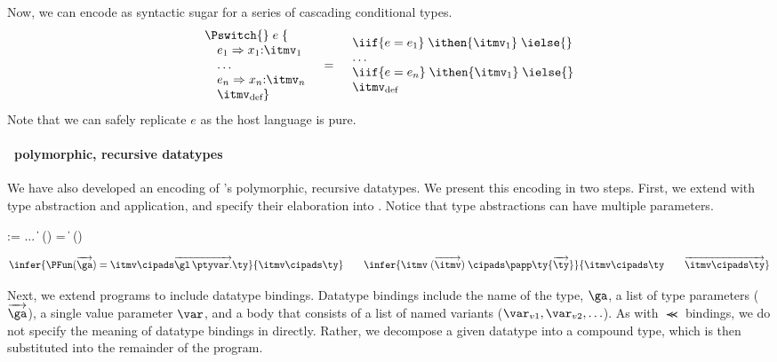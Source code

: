 Now, we can encode \Pswitch{} as syntactic sugar for a series of cascading
conditional types.
{\small
\[
\begin{array}{l}
\Pswitch{}\;e\;\{\\
\quad e_1 \Rightarrow x_1{:}\itmv_1\\ 
\quad \dots \\
\quad e_n \Rightarrow x_n{:}\itmv_n\\
\quad \itmv_{\text{def}} \}
\end{array}
\quad
 \mathbf{=}
\quad
\begin{array}{l} 
    \iif {e = e_1}\; \ithen {\itmv_1}\; \ielse{}\\
    \dots\\
    \iif {e = e_n}\; \ithen {\itmv_1}\; \ielse{}\\
    \itmv_{\text{def}}
\end{array}
\]}%
\noindent
Note that we can safely replicate $e$ as the
host language is pure.

\paragraph*{\padsml\ polymorphic, recursive datatypes}
We have also developed an encoding of \padsml{}'s polymorphic,
recursive datatypes. We present this encoding in two steps. First, we
extend \ipads{} with type abstraction and application, and specify
their elaboration into \ddc{}. Notice that \ipads{} type abstractions
can have multiple parameters.
\begin{bnf}
   \meta{\itmv} \::= ... \| 
\PFun{}\; (\overrightarrow \alpha) = \itmv
  \|   \itmv \; (\overrightarrow \itmv)

\end{bnf}
\[
  \infer{ 
     \PFun (\overrightarrow \ga) = \itmv \cipads \overrightarrow{\gl\,\ptyvar.}\ty
  }{
    \itmv \cipads \ty
  }
\qquad
  \infer{ 
     \itmv \; (\overrightarrow {\itmv}) \; \cipads \papp \ty
     {\overrightarrow {\ty}}
  }{
     \itmv \cipads \ty \qquad \overrightarrow {\itmv \cipads \ty}
  }
\]

Next, we extend \ipads{} programs to include datatype bindings.
Datatype bindings include the name of the type, $\ga$, a list of type
parameters ($\overrightarrow \ga$), a single value parameter $\var$, and a body
that consists of a list of named variants ($\var_{v1},\var_{v2}, \ldots$). As with $\Prec$ bindings,
we do not specify the meaning of datatype bindings in \ddc{} directly.
Rather, we decompose a given datatype into a compound \ipads{} type,
which is then substituted into the remainder of the program.

